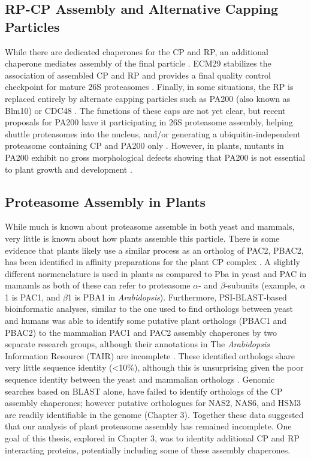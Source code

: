 \subsection{RP-CP Assembly and Alternative Capping Particles}
 	While there are dedicated chaperones for the CP and RP, an additional chaperone mediates assembly of the final particle \citep{ramos98}.  ECM29 stabilizes the association of assembled CP and RP and provides a final quality control checkpoint for mature 26S proteasomes \citep{besche14, lehmann10}.  
	Finally, in some situations, the RP is replaced entirely by alternate capping particles such as PA200 (also known as Blm10) or CDC48 \citep{barthelme12, book10, schmidt05}.  The functions of these caps are not yet clear, but recent proposals for PA200 have it participating in 26S proteasome assembly, helping shuttle proteasomes into the nucleus, and/or generating a ubiquitin-independent proteasome containing CP and PA200 only \citep{dange11, sadre-bazzaz10, weberruss13}. However, in plants, mutants in PA200 exhibit no gross morphological defects showing that PA200 is not essential to plant growth and development \citep{book10}.

\subsection{Proteasome Assembly in Plants}
	While much is known about proteasome assemble in both yeast and mammals, very little is known about how plants assemble this particle. There is some evidence that plants likely use a similar process as an ortholog of PAC2, PBAC2, has been identified in affinity preparations for the plant CP complex \citep{book10}. A slightly different normenclature is used in plants as compared to Pba in yeast and PAC in mamamls as both of these can refer to proteasome $\alpha$- and $\beta$-subunits (example, $\alpha$1 is PAC1, and $\beta$1 is PBA1 in \textit{Arabidopsis}). Furthermore, PSI-BLAST-based bioinformatic analyses, similar to the one used to find orthologs between yeast and humans was able to identify some putative plant orthologs (PBAC1 and PBAC2) to the mammalian PAC1 and PAC2 assembly chaperones by two separate research groups, although their annotations in The \textit{Arabidopsis} Information Resource (TAIR) are incomplete \citep{kusmierczyk11, le07}. These identified orthologs share very little sequence identity (<10\%), although this is unsurprising given the poor sequence identity between the yeast and mammalian orthologs \citep{kusmierczyk11, le07, murata09}.  Genomic searches based on BLAST alone, have failed to identify orthologs of the CP assembly chaperones; however putative orthologues for NAS2, NAS6, and HSM3 are readily identifiable in the genome (Chapter 3).  Together these data suggested that our analysis of plant proteasome assembly has remained incomplete. One goal of this thesis, explored in Chapter 3, was to identity additional CP and RP interacting proteins, potentially including some of these assembly chaperones.

